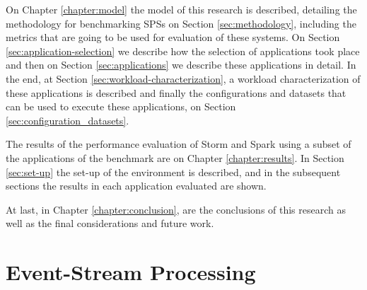 \documentclass[ppgc,diss,english]{iiufrgs}
\begin{document}
On Chapter \ref{chapter:model} the model of this research is described, detailing the methodology for benchmarking SPSs on Section \ref{sec:methodology}, including the metrics that are going to be used for evaluation of these systems. On Section \ref{sec:application-selection} we describe how the selection of applications took place and then on Section \ref{sec:applications} we describe these applications in detail. In the end, at Section \ref{sec:workload-characterization}, a workload characterization of these applications is described and finally the configurations and datasets that can be used to execute these applications, on Section \ref{sec:configuration_datasets}.

The results of the performance evaluation of Storm and Spark using a subset of the applications of the benchmark are on Chapter \ref{chapter:results}. In Section \ref{sec:set-up} the set-up of the environment is described, and in the subsequent sections the results in each application evaluated are shown.

At last, in Chapter \ref{chapter:conclusion}, are the conclusions of this research as well as the final considerations and future work.

\chapter{Event-Stream Processing}
\label{chapter:event-stream-processing}

%
%
\end{document}
